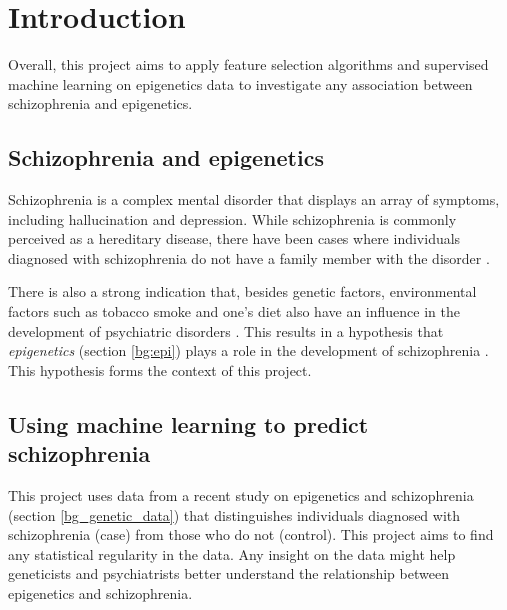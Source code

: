 \documentclass[12pt, twoside, a4paper]{report}
\newcommand\blankpage{%
    \null
    \thispagestyle{empty}%
    \addtocounter{page}{-1}%
    \newpage}
\begin{document}


\afterpage{\blankpage}

\doublespacing
\tableofcontents
\singlespacing

\newpage


\chapter{Introduction}


Overall, this project aims to apply feature selection algorithms and supervised machine learning on epigenetics data to investigate any association between schizophrenia and epigenetics.

\section{Schizophrenia and epigenetics}
\label{intro:epi}

Schizophrenia is a complex mental disorder that displays an array of symptoms, including hallucination and depression. While schizophrenia is commonly perceived as a hereditary disease, there have been cases where individuals diagnosed with schizophrenia do not have a family member with the disorder \cite{RefWorks:8}. 

There is also a strong indication that, besides genetic factors, environmental factors such as tobacco smoke and one's diet also have an influence in the development of psychiatric disorders \cite{RefWorks:8, RefWorks:10, RefWorks:247}. This results in a hypothesis that \textit{epigenetics} (section \ref{bg:epi}) plays a role in the development of schizophrenia \cite{RefWorks:12}. This hypothesis forms the context of this project.


\section{Using machine learning to predict schizophrenia} \label{intro_ML}

This project uses data from a recent study on epigenetics and schizophrenia (section \ref{bg_genetic_data}) that distinguishes individuals diagnosed with schizophrenia (case) from those who do not (control). This project aims to find any statistical regularity in the data. Any insight on the data might help geneticists and psychiatrists better understand the relationship between epigenetics and schizophrenia.
\end{document}
